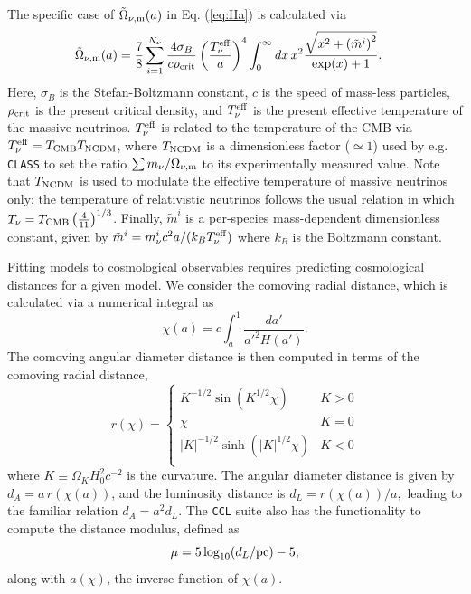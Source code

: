 \documentclass[\docopts]{\docclass}
\newcommand{\ccl}{{\tt CCL}\xspace}
\newcommand{\class}{{\tt CLASS}\xspace}
\begin{document}
The specific case of $\tilde\Omega_{\nu, {\rm m}}(a)$ in Eq. (\ref{eq:Ha}) is calculated via
\begin{align}
\tilde\Omega_{\nu, {\rm m}}(a) &= \frac{7}{8}\sum_{i=1}^{N_\nu} \frac{4 \sigma_{B}}{c \rho_{{\rm crit}}} \left(\frac{T_{\nu}^{\rm eff}}{a}\right)^4  \int_0^{\infty} dx \, x^2 \frac{\sqrt{x^2 + \left(\tilde{m}^i\right)^2}}{\exp(x) + 1}.
\label{Omnu}
\end{align}
Here, $\sigma_B$ is the Stefan-Boltzmann constant, $c$ is the speed of mass-less particles, $\rho_{{\rm crit}}$ is the present critical density, and $T_{\nu}^{\rm eff}$ is the present effective temperature of the massive neutrinos. $T_{\nu}^{\rm eff}$ is related to the temperature of the CMB via $T_{\nu}^{\rm eff} = T_{\rm CMB} T_{\rm NCDM}$, where $T_{\rm NCDM}$ is a dimensionless factor ($\simeq1$) used by e.g. \class to set the ratio ${\sum m_\nu}/{\Omega_{\nu, {\rm m}}}$ to its experimentally measured value. Note that $T_{\rm NCDM}$ is used to modulate the effective temperature of massive neutrinos only; the temperature of relativistic neutrinos follows the usual relation in which $T_\nu = T_{\rm CMB} \left(\frac{4}{11}\right)^{1/3}$. Finally, $\tilde{m}^i$ is a per-species mass-dependent dimensionless constant, given by $\tilde{m}^i = m_{\nu}^{i}c^2 a / (k_B T_{\nu}^{\rm eff})$ where $k_B$ is the Boltzmann constant.



Fitting models to cosmological observables requires predicting cosmological distances for a given model. We consider the comoving radial distance, which is calculated via a numerical integral as
\begin{equation}
 \chi(a)= c \int_a^1 \frac{da'}{a'^2 H(a')}.
 \label{eq:comrdist}
\end{equation}
The comoving angular diameter distance is then computed in terms of the comoving radial distance,
\begin{equation}\label{eq:angdist}
 r(\chi)=\left\{\begin{array}{cc}
                 K^{-1/2}\sin(K^{1/2}\chi) & K>0\\
                 \chi & K=0\\
                 |K|^{-1/2}\sinh(|K|^{1/2}\chi) & K<0\\
                \end{array}\right.
\end{equation}
where $K \equiv \Omega_K H_0^2 c^{-2}$ is the curvature.
The angular diameter distance is given by $d_A=a\,r(\chi(a))$, and the luminosity distance is
$d_L=r(\chi(a))/a,$ leading to the familiar relation $d_A = a^2d_L$.
The \ccl suite also has the functionality to compute the distance modulus, defined as
\begin{equation}\label{eq:distmod}
    \mu = 5 \log_{10}(d_L / {\rm pc})-5,
\end{equation}
along with $a(\chi)$, the inverse function of $\chi(a)$.
\end{document}
